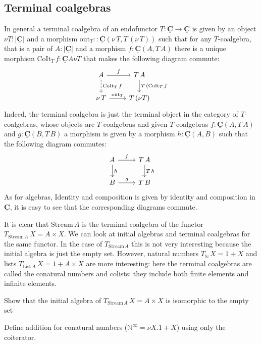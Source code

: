 \documentclass{article}
\newcommand{\cat}[1]{\underline{\mathbf{#1}}}
\newcommand{\obj}[1]{|#1|}
\newcommand{\homC}[3]{\cat{#1}(#2,#3)}
\newcommand{\Nat}{\mathbb{N}}
\newcommand{\List}{\mathrm{List}}
\newcommand{\out}{\mathrm{out}}
\newcommand{\Stream}{\mathrm{Stream}}
\newcommand{\CoIt}{\mathrm{CoIt}}
\begin{document}
\subsection{Terminal coalgebras}
\label{sec:terminal-coalgebras}

In general a terminal coalgebra of an endofunctor $T : \cat{C} \to \cat{C}$ is given by an object $\nu T : \obj{\cat{C}}$ and a morphism $\out_T : : \homC{C}{\nu\,T}{T\,(\nu\,T)}$ such that for any $T$-coalgebra, that is a pair of $A : \obj{\cat{C}}$ and a morphism 
$f : \homC{C}{A}{T\,A}$ there is a unique morphism $\CoIt_T \,f: \cat{C}{A}{\nu T}$
that makes the following diagram commute:
\[\begin{tikzcd}
A \arrow[d,"\CoIt_T \, f" right,dashrightarrow] \arrow[r,"f"]  & T\,A \arrow[d, "T\, (\CoIt_T \, f"]\\
\nu\,T  \arrow[r,"\out_T"] & T\,(\nu T) 
\end{tikzcd}\]  
Indeed, the terminal coalgebra is just the terminal object in the category of $T$-coalgebras, whose objects are $T$-coalgebras and given $T$-coalgebras $f : \homC{C}{A}{T\,A}$ and $g : \homC{C}{B}{T\,B}$ a morphism is given by a morphism $h : \homC{C}{A}{B}$ such that the following diagram commutes:
\[\begin{tikzcd}
 A \arrow[d,"h"] \arrow[r,"f"]  & T\,A \arrow[d,"T\,h"]\\
 B \arrow[r,"g"] & T\,B 
\end{tikzcd}\]  
As for algebras, Identity and composition is given by identity and composition in $\cat{C}$, it is easy to see that the corresponding diagrams commute. 

It is clear that $\Stream\,A$ is the terminal coalgebra of the functor $T_{\Stream\,A}\,X = A \times X$. We can look at initial algebras and terminal coalgebras for the same functor. In the case of $T_{\Stream\,A}$  this is not very interesting because the initial algebra is just the empty set. However, natural numbers $T_\Nat\,X = 1+X$ and lists $T_{\List\,A}\,X = 1 + A \times X$ are more interesting: here the terminal coalgebras are called the conatural numbers and colists: they include both finite elements and infinite elements. 

\begin{Exercise}
  Show that the initial algebra of $T_{\Stream\,A}\,X = A \times X$ is isomorphic to the empty set
\end{Exercise}

\begin{Exercise}
  Define addition for conatural numbers ($\Nat^\infty = \nu X.1+X$) using only the coiterator.
\end{Exercise}
\end{document}
